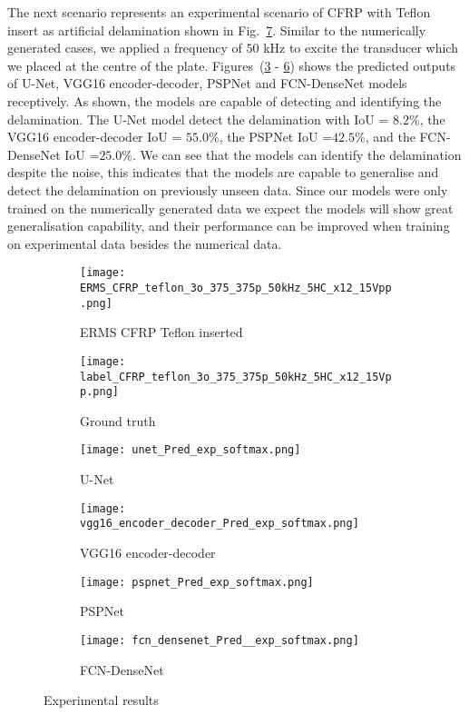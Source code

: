The next scenario represents an experimental scenario of CFRP with Teflon insert as artificial delamination shown in Fig.~\ref{fig:Exp_ERMS_teflon}.
Similar to the numerically generated cases, we applied a frequency of \(50\) kHz to excite the transducer which we placed at the centre of the plate.
Figures~(\ref{fig:unet_exp_7_} - \ref{fig:fcn_densenet_exp}) shows the predicted outputs of U-Net, VGG16 encoder-decoder, PSPNet and FCN-DenseNet models receptively.
As shown, the models are capable of detecting and identifying the delamination. 
The U-Net model detect the delamination with IoU = \(8.2\%\), the VGG16 encoder-decoder IoU  = \(55.0\%\), the PSPNet IoU =\(42.5\%\), and the FCN-DenseNet IoU =\(25.0\%\).
We can see that the models can identify the delamination despite the noise, this indicates that the models are capable to generalise and detect the delamination on previously unseen data. 
Since our models were only trained on the numerically generated data we expect the models will show great generalisation capability, and their performance can be improved when training on experimental data besides the numerical data. 
\begin{figure} [!h]
	\centering
	\begin{subfigure}[b]{0.47\textwidth}
		\centering
		\texttt{[image: ERMS\_CFRP\_teflon\_3o\_375\_375p\_50kHz\_5HC\_x12\_15Vpp.png]}
		\caption{ERMS CFRP Teflon inserted}
		\label{fig:Delamination}
	\end{subfigure}			
	\hfill
	\begin{subfigure}[b]{0.47\textwidth}
		\centering 	
		\texttt{[image: label\_CFRP\_teflon\_3o\_375\_375p\_50kHz\_5HC\_x12\_15Vpp.png]}
		\caption{Ground truth} 
		\label{fig:damage_label}
	\end{subfigure}
	\hfill
	\begin{subfigure}[b]{0.47\textwidth}
		\centering
		\texttt{[image: unet\_Pred\_exp\_softmax.png]}
		\caption{U-Net} 
		\label{fig:unet_exp_7_}
	\end{subfigure}
	\hfill
	\begin{subfigure}[b]{0.47\textwidth}
	\centering
	\texttt{[image: vgg16\_encoder\_decoder\_Pred\_exp\_softmax.png]}
	\caption{VGG16 encoder-decoder} 
	\label{fig:vgg16_exp_7_}
	\end{subfigure}
	\hfill
	\begin{subfigure}[b]{0.47\textwidth}
		\centering
		\texttt{[image: pspnet\_Pred\_exp\_softmax.png]}
		\caption{PSPNet} 
		\label{fig:pspnet_exp_7_}
	\end{subfigure}
	\hfill
	\begin{subfigure}[b]{0.47\textwidth}
		\centering
		\texttt{[image: fcn\_densenet\_Pred\_\_exp\_softmax.png]}
		\caption{FCN-DenseNet} 
		\label{fig:fcn_densenet_exp}
	\end{subfigure}
		\caption{Experimental results}
		\label{fig:Exp_ERMS_teflon}
	\end{figure}

